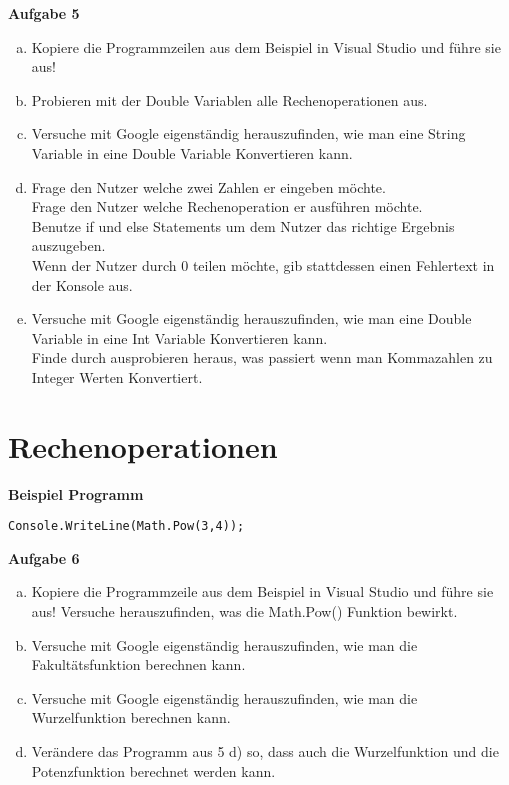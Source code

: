 \documentclass[a4paper,12pt]{article}
\newcommand{\Aufgabe}[1]{
  {
  \vspace*{0.5cm}
  \textsf{\textbf{Aufgabe #1}}
  \vspace*{0.2cm}
  
  }
}
\newcommand{\Definition}[1]{
  {
  \vspace*{0.5cm}
  \textsf{\textbf{#1}}
  \vspace*{0.2cm}
  
  }
}
\begin{document}
\Aufgabe{5} 
\begin{enumerate}[a)]
\item
Kopiere die Programmzeilen aus dem Beispiel in Visual Studio und führe sie aus!
\item
Probieren mit der Double Variablen alle Rechenoperationen aus.
\item
Versuche mit Google eigenständig herauszufinden, wie man eine String Variable in eine Double Variable Konvertieren kann.
\item
Frage den Nutzer welche zwei Zahlen er eingeben möchte. \\
Frage den Nutzer welche Rechenoperation er ausführen möchte. \\
Benutze if und else Statements um dem Nutzer das richtige Ergebnis auszugeben. \\
Wenn der Nutzer durch 0 teilen möchte, gib stattdessen einen Fehlertext in der Konsole aus.
\item
Versuche mit Google eigenständig herauszufinden, wie man eine Double Variable in eine Int Variable Konvertieren kann. \\
Finde durch ausprobieren heraus, was passiert wenn man Kommazahlen zu Integer Werten Konvertiert.

\end{enumerate}

\section{Rechenoperationen}
\Definition{Beispiel Programm}

\begin{verbatim}
Console.WriteLine(Math.Pow(3,4));
\end{verbatim}

\Aufgabe{6} 
\begin{enumerate}[a)]
\item
Kopiere die Programmzeile aus dem Beispiel in Visual Studio und führe sie aus! Versuche herauszufinden, was die Math.Pow() Funktion bewirkt.
\item
Versuche mit Google eigenständig herauszufinden, wie man die Fakultätsfunktion berechnen kann.
\item
Versuche mit Google eigenständig herauszufinden, wie man die Wurzelfunktion berechnen kann.
\item
Verändere das Programm aus 5 d) so, dass auch die Wurzelfunktion und die Potenzfunktion berechnet werden kann.
\end{enumerate}

\end{document}
